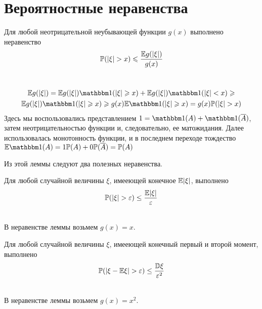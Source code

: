 \documentclass[../TV&MS.tex]{subfiles}
\begin{document}
    
\section{Вероятностные неравенства}
\begin{Lem}
Для любой неотрицательной неубывающей функции $g(x)$ выполнено неравенство 
$$\mathbb{P}(|\xi| > x) \leqslant \frac{\mathbb{E} g(|\xi|)}{g(x)}$$
\end{Lem}
\begin{Proof} \\
\begin{multline*}
    \Expec g(|\xi|) = \Expec g(|\xi|) \Ind(|\xi| \geqslant x) +
    \Expec g(|\xi|) \Ind(|\xi| < x) \geqslant \\
    \Expec g(|\xi|) \Ind(|\xi| \geqslant x) \geqslant 
    g(x)\Expec\Ind(|\xi| \geqslant x) = g(x)\Pro(|\xi| > x)
\end{multline*}
Здесь мы воспользовались представлением $1 = \Ind(A) + \Ind(\overline{A})$, затем неотрицательностью функции и, следовательно, ее матожидания. Далее использовалась монотонность функции, и в последнем переходе тождество $\Expec \Ind(A) = 1 \Pro(A) + 0 \Pro(\overline{A}) = \Pro(A)$
\end{Proof}

Из этой леммы следуют два полезных неравенства.

\begin{Th} 
Для любой случайной величины $\xi$, имееющей конечное $\mathbb{E}|\xi|$, выполнено
$$\mathbb{P}(|\xi| > \varepsilon) \le \frac{\mathbb{E}|\xi|}{\varepsilon}$$
\end{Th}
\begin{Proof}\\
В неравенстве леммы возьмем $g(x) = x$.
\end{Proof}

\begin{Th} 
Для любой случайной величины $\xi$, имееющей конечный первый и второй момент, выполнено
$$\mathbb{P}(|\xi - \mathbb{E}\xi| > \varepsilon) \le \frac{\mathbb{D}\xi}{\varepsilon^2}$$
\end{Th}
\begin{Proof}\\
В неравенстве леммы возьмем $g(x) = x^2$.
\end{Proof}

\newpage
\end{document}
